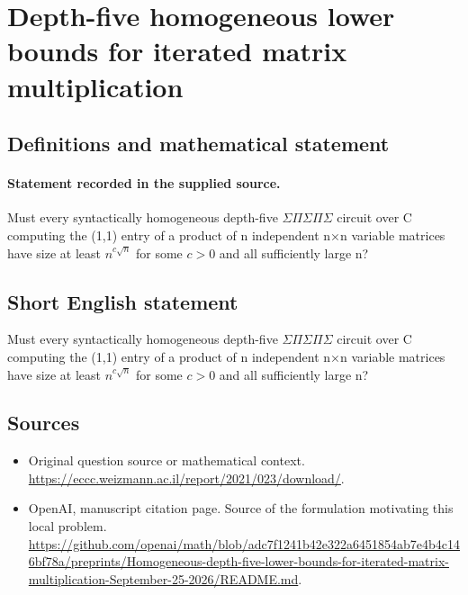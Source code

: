 \documentclass[11pt]{article}
\begin{document}
\section*{Depth-five homogeneous lower bounds for iterated matrix multiplication}\label{30007460}
\subsection{Definitions and mathematical statement}
\paragraph{Statement recorded in the supplied source.}
Must every syntactically homogeneous depth-five $\Sigma \Pi \Sigma \Pi \Sigma $ circuit over C computing the (1,1) entry of a product of n independent n×n variable matrices have size at least $n^{c\surd n}$ for some $c>0$ and all sufficiently large n?
\subsection{Short English statement}
Must every syntactically homogeneous depth-five $\Sigma \Pi \Sigma \Pi \Sigma $ circuit over C computing the (1,1) entry of a product of n independent n×n variable matrices have size at least $n^{c\surd n}$ for some $c>0$ and all sufficiently large n?
\subsection{Sources}
\begin{itemize}
\item[S1] Original question source or mathematical context.
\url{https://eccc.weizmann.ac.il/report/2021/023/download/}.
\item[S2] OpenAI, manuscript citation page. Source of the formulation motivating this local problem.
\url{https://github.com/openai/math/blob/adc7f1241b42e322a6451854ab7e4b4c146bf78a/preprints/Homogeneous-depth-five-lower-bounds-for-iterated-matrix-multiplication-September-25-2026/README.md}.
\end{itemize}
\end{document}
